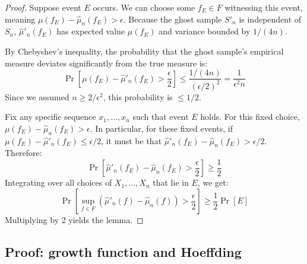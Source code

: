 \documentclass[a4paper]{article}
\begin{document}
\begin{proof}
    Suppose event $E$ occurs. We can choose some $f_E \in F$ witnessing this event, meaning $\mu(f_E) - \hat{\mu}_n(f_E) > \epsilon$. Because the ghost sample $S'_n$ is independent of $S_n$, $\hat{\mu}'_n(f_E)$ has expected value $\mu(f_E)$ and variance bounded by $1/(4n)$. 
    
    By Chebyshev's inequality, the probability that the ghost sample's empirical measure deviates significantly from the true measure is:
    \[
        \Pr\left[ \mu(f_E) - \hat{\mu}'_n(f_E) > \frac{\epsilon}{2} \right] \leq \frac{1/(4n)}{(\epsilon/2)^2} = \frac{1}{\epsilon^2 n}
    \]
    Since we assumed $n \geq 2/\epsilon^2$, this probability is $\leq 1/2$. 

    Fix any specific sequence $x_1, \dots, x_n$ such that event $E$ holds. For this fixed choice, $\mu(f_E) - \hat{\mu}_n(f_E) > \epsilon$. In particular, for these fixed events, if $\mu(f_E) - \hat{\mu}'_n(f_E) \leq \epsilon/2$, it must be that $\hat{\mu}'_n(f_E) - \hat{\mu}_n(f_E) > \epsilon/2$. Therefore:
    \[
        \Pr\left[ \hat{\mu}'_n(f_E) - \hat{\mu}_n(f_E) > \frac{\epsilon}{2} \right] \geq \frac{1}{2}
    \]
    Integrating over all choices of $X_1, \dots, X_n$ that lie in $E$, we get:
    \[
        \Pr\left[ \sup_{f \in F} (\hat{\mu}'_n(f) - \hat{\mu}_n(f)) > \frac{\epsilon}{2} \right] \geq \frac{1}{2}\Pr[E]
    \]
    Multiplying by 2 yields the lemma.
\end{proof}

\subsection{Proof: growth function and Hoeffding}
\end{document}
